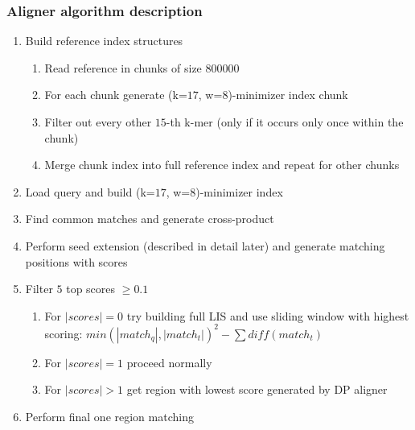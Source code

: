 \documentclass{beamer}
\begin{document}
\begin{frame}
  \frametitle{Aligner algorithm description}
  \scriptsize
  \begin{enumerate}
    \item Build reference index structures
    \begin{enumerate}
      \scriptsize
      \item Read reference in chunks of size $800000$
      \item For each chunk generate (k=$17$, w=$8$)-minimizer index chunk
      \item Filter out every other $15$-th k-mer (only if it occurs only once within the chunk)
      \item Merge chunk index into full reference index and repeat for other chunks
    \end{enumerate}
    \item Load query and build (k=$17$, w=$8$)-minimizer index
    \item Find common matches and generate cross-product
    \item Perform seed extension (described in detail later) and generate matching positions with scores
    \item Filter $5$ top scores $\geq 0.1$
    \begin{enumerate}
        \scriptsize
        \item For $|scores| = 0$ try building full LIS and use sliding window with highest scoring: $min(|match_q|, |match_t|)^2 - \sum {diff(match_t)}$
        \item For $|scores| = 1$ proceed normally
        \item For $|scores| > 1$ get region with lowest score generated by DP aligner
    \end{enumerate}
    \item Perform final one region matching
  \end{enumerate}

\end{frame}
\end{document}
